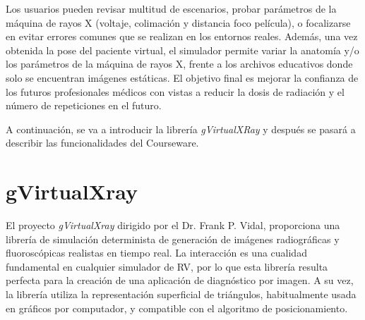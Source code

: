 Los usuarios pueden revisar multitud de escenarios, probar parámetros de la máquina de rayos X (voltaje, colimación y distancia foco película), o focalizarse en evitar errores comunes que se realizan en los entornos reales. Además, una vez obtenida la pose del paciente virtual, el simulador permite variar la anatomía y/o los parámetros de la máquina de rayos X, frente a los archivos educativos donde solo se encuentran imágenes estáticas. El objetivo final es mejorar la confianza de los futuros profesionales médicos con vistas a reducir la dosis de radiación y el número de repeticiones en el futuro.%






A continuación, se va a introducir la librería \emph{gVirtualXRay} y después se pasará a describir las funcionalidades del \ac{Courseware}.


\section{gVirtualXray}
\label{xray:context}

El proyecto \emph{gVirtualXray} \cite{sujar:hal} dirigido por el Dr. Frank P. Vidal, proporciona una librería de simulación determinista de generación de imágenes radiográficas y fluoroscópicas realistas en tiempo real. %
La interacción es una cualidad fundamental en cualquier simulador de \ac{RV}, por lo que esta librería resulta perfecta para la creación de una aplicación de diagnóstico por imagen. 
A su vez, la librería utiliza la representación superficial de triángulos, habitualmente usada en gráficos por computador, y compatible con el algoritmo de posicionamiento.


